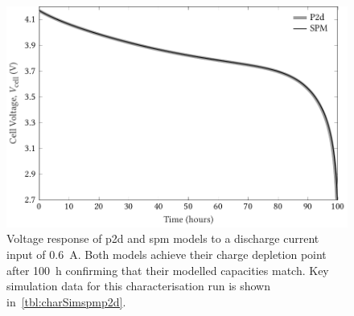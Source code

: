 \begin{figure}[!htb]
    \centering
    \includegraphics{4/figures/capacity_match_spm_p2d.pdf}
    \caption[Voltage response of  \&  models
    for capacity validation]{Voltage response of \gls{p2d} and \gls{spm} models
        to a discharge current input of \SI{0.6}{A}. Both models achieve their
        charge depletion point after \approx\SI{100}{\hour} confirming that
        their modelled capacities match. Key simulation data for this
    characterisation run is shown in~\cref{tbl:charSimspmp2d}.}
    \label{fig:capcharspmp2d}
\end{figure}

